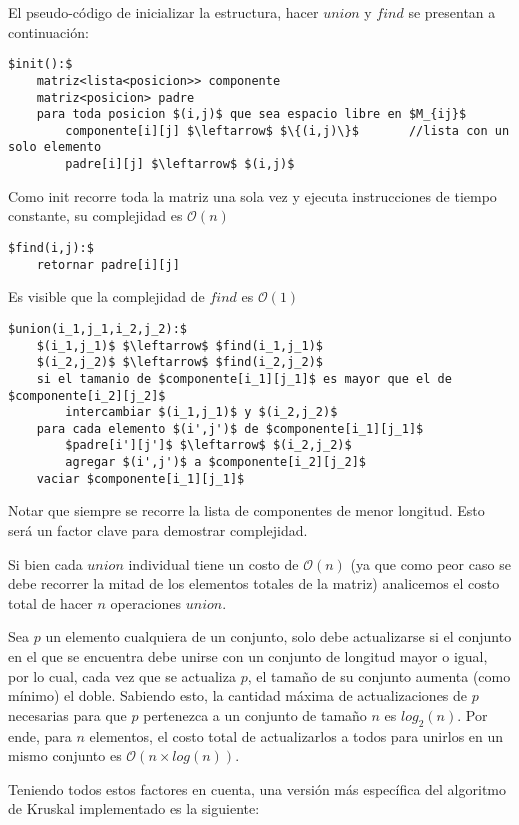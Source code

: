 El pseudo-código de inicializar la estructura, hacer $union$ y $find$ se presentan a continuación:

\begin{lstlisting}
$init():$
	matriz<lista<posicion>> componente
	matriz<posicion> padre
	para toda posicion $(i,j)$ que sea espacio libre en $M_{ij}$
		componente[i][j] $\leftarrow$ $\{(i,j)\}$		//lista con un solo elemento
		padre[i][j] $\leftarrow$ $(i,j)$
\end{lstlisting}

Como init recorre toda la matriz una sola vez y ejecuta instrucciones de tiempo constante, su complejidad es $\mathcal{O}(n)$

\begin{lstlisting}
$find(i,j):$
	retornar padre[i][j]
\end{lstlisting}

Es visible que la complejidad de $find$ es $\mathcal{O}(1)$

\begin{lstlisting}
$union(i_1,j_1,i_2,j_2):$
	$(i_1,j_1)$ $\leftarrow$ $find(i_1,j_1)$
	$(i_2,j_2)$ $\leftarrow$ $find(i_2,j_2)$
	si el tamanio de $componente[i_1][j_1]$ es mayor que el de $componente[i_2][j_2]$
		intercambiar $(i_1,j_1)$ y $(i_2,j_2)$
	para cada elemento $(i',j')$ de $componente[i_1][j_1]$
		$padre[i'][j']$ $\leftarrow$ $(i_2,j_2)$
		agregar $(i',j')$ a $componente[i_2][j_2]$
	vaciar $componente[i_1][j_1]$
\end{lstlisting}

Notar que siempre se recorre la lista de componentes de menor longitud. Esto será un factor clave para demostrar complejidad.

Si bien cada $union$ individual tiene un costo de $\mathcal{O}(n)$ (ya que como peor caso se debe recorrer la mitad de los elementos totales de la matriz) analicemos el costo total de hacer $n$ operaciones $union$.

Sea $p$ un elemento cualquiera de un conjunto, solo debe actualizarse si el conjunto en el que se encuentra debe unirse con un conjunto de longitud mayor o igual, por lo cual, cada vez que se actualiza $p$, el tamaño de su conjunto aumenta (como mínimo) el doble. Sabiendo esto, la cantidad máxima de actualizaciones de $p$ necesarias para que $p$ pertenezca a un conjunto de tamaño $n$ es $log_2(n)$. Por ende, para $n$ elementos, el costo total de actualizarlos a todos para unirlos en un mismo conjunto es $\mathcal{O}(n \times log(n))$.

Teniendo todos estos factores en cuenta, una versión más específica del algoritmo de Kruskal implementado es la siguiente:

